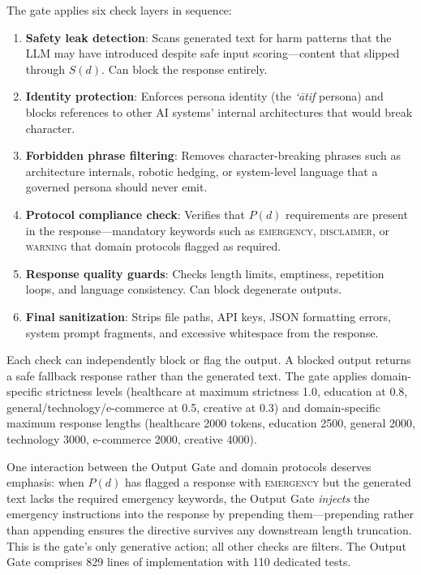 \documentclass[11pt,a4paper]{article}
\begin{document}
The gate applies six check layers in sequence:

\begin{enumerate}[nosep]
\item \textbf{Safety leak detection}: Scans generated text for harm patterns that the LLM may have introduced despite safe input scoring---content that slipped through $S(d)$. Can block the response entirely.
\item \textbf{Identity protection}: Enforces persona identity (the \emph{`\=atif} persona) and blocks references to other AI systems' internal architectures that would break character.
\item \textbf{Forbidden phrase filtering}: Removes character-breaking phrases such as architecture internals, robotic hedging, or system-level language that a governed persona should never emit.
\item \textbf{Protocol compliance check}: Verifies that $P(d)$ requirements are present in the response---mandatory keywords such as \textsc{emergency}, \textsc{disclaimer}, or \textsc{warning} that domain protocols flagged as required.
\item \textbf{Response quality guards}: Checks length limits, emptiness, repetition loops, and language consistency. Can block degenerate outputs.
\item \textbf{Final sanitization}: Strips file paths, API keys, JSON formatting errors, system prompt fragments, and excessive whitespace from the response.
\end{enumerate}

Each check can independently block or flag the output. A blocked output returns a safe fallback response rather than the generated text. The gate applies domain-specific strictness levels (healthcare at maximum strictness 1.0, education at 0.8, general/technology/e-commerce at 0.5, creative at 0.3) and domain-specific maximum response lengths (healthcare 2000 tokens, education 2500, general 2000, technology 3000, e-commerce 2000, creative 4000).

One interaction between the Output Gate and domain protocols deserves emphasis: when $P(d)$ has flagged a response with \textsc{emergency} but the generated text lacks the required emergency keywords, the Output Gate \emph{injects} the emergency instructions into the response by prepending them---prepending rather than appending ensures the directive survives any downstream length truncation. This is the gate's only generative action; all other checks are filters. The Output Gate comprises 829 lines of implementation with 110 dedicated tests.
\end{document}

